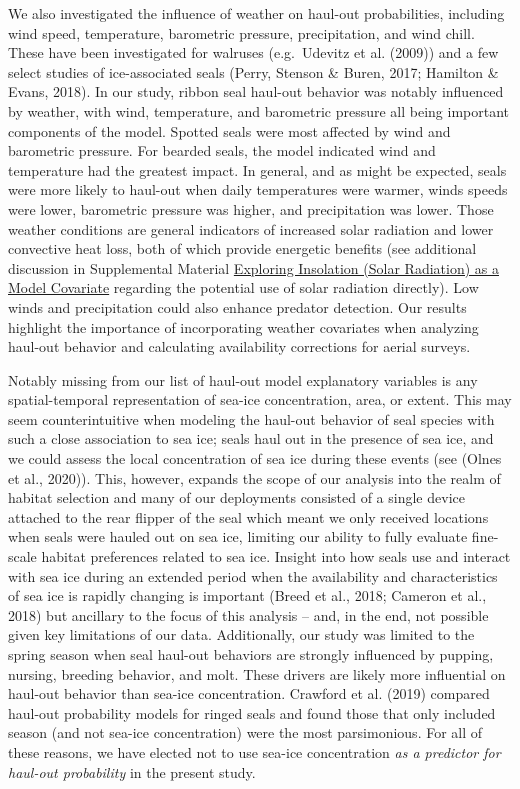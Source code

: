 \documentclass[fleqn,10pt,lineno]{wlpeerj} %
\begin{document}
We also investigated the influence of weather on haul-out probabilities,
including wind speed, temperature, barometric pressure, precipitation, and wind
chill. These have been investigated for walruses (e.g.~Udevitz et al.
(2009)) and a few select studies of ice-associated seals
(Perry, Stenson \& Buren, 2017; Hamilton \& Evans, 2018). In our study, ribbon seal haul-out behavior was notably
influenced by weather, with wind, temperature, and barometric pressure all being
important components of the model. Spotted seals were most affected by wind and
barometric pressure. For bearded seals, the model indicated wind and temperature
had the greatest impact. In general, and as might be expected, seals were more
likely to haul-out when daily temperatures were warmer, winds speeds were lower,
barometric pressure was higher, and precipitation was lower. Those weather
conditions are general indicators of increased solar radiation and lower
convective heat loss, both of which provide energetic benefits (see additional
discussion in Supplemental Material \hyperref[exploring-insolation-solar-radiation-as-a-model-covariate]{Exploring Insolation (Solar Radiation) as a
Model Covariate} regarding the potential use of solar radiation directly). Low
winds and precipitation could also enhance predator detection. Our results
highlight the importance of incorporating weather covariates when analyzing
haul-out behavior and calculating availability corrections for aerial surveys.

Notably missing from our list of haul-out model explanatory variables is any
spatial-temporal representation of sea-ice concentration, area, or extent. This
may seem counterintuitive when modeling the haul-out behavior of seal species
with such a close association to sea ice; seals haul out in the presence of sea
ice, and we could assess the local concentration of sea ice during these events
(see (Olnes et al., 2020)). This, however, expands the scope of our analysis into the
realm of habitat selection and many of our deployments consisted of a single
device attached to the rear flipper of the seal which meant we only received
locations when seals were hauled out on sea ice, limiting our ability to fully
evaluate fine-scale habitat preferences related to sea ice. Insight into how
seals use and interact with sea ice during an extended period when the
availability and characteristics of sea ice is rapidly changing is important
(Breed et al., 2018; Cameron et al., 2018) but ancillary to the focus of this analysis -- and,
in the end, not possible given key limitations of our data. Additionally, our
study was limited to the spring season when seal haul-out behaviors are strongly
influenced by pupping, nursing, breeding behavior, and molt. These drivers are
likely more influential on haul-out behavior than sea-ice concentration.
Crawford et al. (2019) compared haul-out probability models for ringed
seals and found those that only included season (and not sea-ice concentration)
were the most parsimonious. For all of these reasons, we have elected not to use
sea-ice concentration \emph{as a predictor for haul-out probability} in the present
study.
\end{document}

